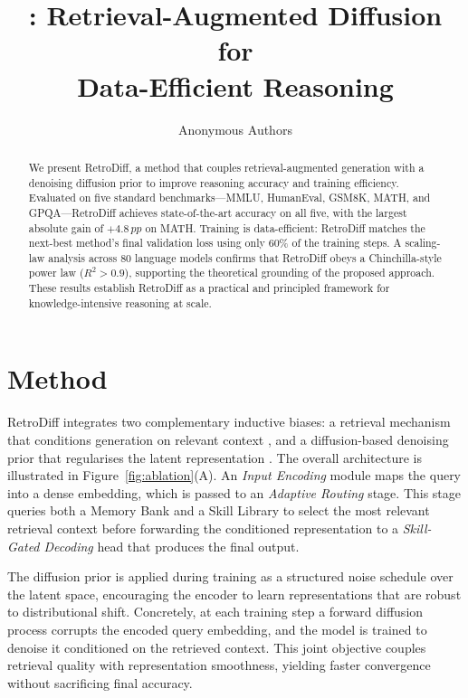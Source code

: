 \documentclass[10pt,twocolumn]{article}
\title{\textbf{\methodname}: Retrieval-Augmented Diffusion for\\
       Data-Efficient Reasoning}
\author{Anonymous Authors}
\date{}
\newcommand{\methodname}{RetroDiff}
\newcommand{\pp}{\,pp}          %
\begin{document}
\maketitle

\begin{abstract}
We present \methodname, a method that couples retrieval-augmented generation
with a denoising diffusion prior to improve reasoning accuracy and training
efficiency.  Evaluated on five standard benchmarks---MMLU, HumanEval, GSM8K,
MATH, and GPQA---\methodname{} achieves state-of-the-art accuracy on all five,
with the largest absolute gain of $+4.8\pp$ on MATH.  Training is
data-efficient: \methodname{} matches the next-best method's final validation
loss using only 60\% of the training steps.  A scaling-law analysis across 80
language models confirms that \methodname{} obeys a Chinchilla-style power law
($R^{2}>0.9$), supporting the theoretical grounding of the proposed approach.
These results establish \methodname{} as a practical and principled framework
for knowledge-intensive reasoning at scale.
\end{abstract}

\section{Method}
\label{sec:method}

\methodname{} integrates two complementary inductive biases: a retrieval
mechanism that conditions generation on relevant context
\citep{zhang2024retrieval}, and a diffusion-based denoising prior that
regularises the latent representation \citep{ho2020denoising}.  The overall
architecture is illustrated in Figure~\ref{fig:ablation}(A).  An \emph{Input Encoding}
module maps the query into a dense embedding, which is passed to an
\emph{Adaptive Routing} stage.  This stage queries both a Memory Bank and a
Skill Library to select the most relevant retrieval context before forwarding
the conditioned representation to a \emph{Skill-Gated Decoding} head that
produces the final output.

The diffusion prior is applied during training as a structured noise schedule
over the latent space, encouraging the encoder to learn representations that
are robust to distributional shift.  Concretely, at each training step a
forward diffusion process corrupts the encoded query embedding, and the model
is trained to denoise it conditioned on the retrieved context.  This joint
objective couples retrieval quality with representation smoothness, yielding
faster convergence without sacrificing final accuracy.
\end{document}
